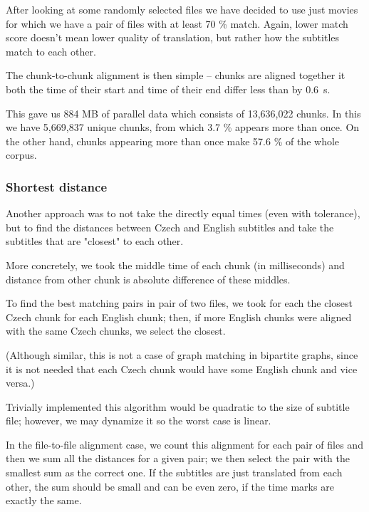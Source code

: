 
After looking at some randomly selected files we have decided to use just movies for which we have a pair of files with at least 70 \% match. Again, lower match score doesn't mean lower quality of translation, but rather how the subtitles match to each other. 

The chunk-to-chunk alignment is then simple -- chunks are aligned together it both the time of their start and time of their end differ less than by 0.6\ s.

This gave us 884 MB of parallel data which consists of 13,636,022 chunks. In this we have 5,669,837 unique chunks, from which 3.7 \% appears more than once. On the other hand, chunks appearing more than once make 57.6 \% of the whole corpus.

\subsubsection{Shortest distance}
Another approach was to not take the directly equal times (even with tolerance), but to find the distances between Czech and English subtitles and take the subtitles that are "closest" to each other.

More concretely, we took the middle time of each chunk (in milliseconds) and distance from other chunk is absolute difference of these middles. 

To find the best matching pairs in pair of two files, we took for each  the closest Czech chunk for each English chunk; then, if more English chunks were aligned with the same Czech chunks, we select the closest.

(Although similar, this is not a case of graph matching in bipartite graphs, since it is not needed that each Czech chunk would have some English chunk and vice versa.)

Trivially implemented this algorithm would be quadratic to the size of subtitle file; however, we may dynamize it so the worst case is linear.

In the file-to-file alignment case, we count this alignment for each pair of files and then we sum all the distances for a given pair; we then select the pair with the smallest sum as the correct one. If the subtitles are just translated from each other, the sum should be small and can be even zero, if the time marks are exactly the same.

